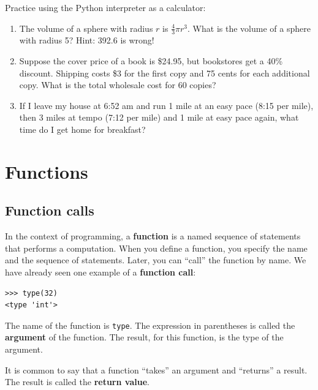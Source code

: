 \documentclass[10pt]{book}
\begin{document}
\begin{ex}
Practice using the Python interpreter as a calculator: 

\begin{enumerate}

\item The volume of a sphere with radius $r$ is $\frac{4}{3} \pi r^3$.
  What is the volume of a sphere with radius 5?  Hint: 392.6 is wrong!

\item Suppose the cover price of a book is \$24.95, but bookstores get a
  40\% discount.  Shipping costs \$3 for the first copy and 75 cents
  for each additional copy.  What is the total wholesale cost for
  60 copies?

\item If I leave my house at 6:52 am and run 1 mile at an easy pace
  (8:15 per mile), then 3 miles at tempo (7:12 per mile) and 1 mile at
  easy pace again, what time do I get home for breakfast?


\end{enumerate}
\end{ex}


\chapter{Functions}
\label{funcchap}

\section{Function calls}
\label{functionchap}

In the context of programming, a {\bf function} is a named sequence of
statements that performs a computation.  When you define a function,
you specify the name and the sequence of statements.  Later, you can
``call'' the function by name.  
We have already seen one example of a {\bf function call}:

\beforeverb
\begin{verbatim}
>>> type(32)
<type 'int'>
\end{verbatim}
\afterverb
%
The name of the function is {\tt type}.  The expression in parentheses
is called the {\bf argument} of the function.  The result, for this
function, is the type of the argument.


It is common to say that a function ``takes'' an argument and ``returns''
a result.  The result is called the {\bf return value}.
\end{document}
